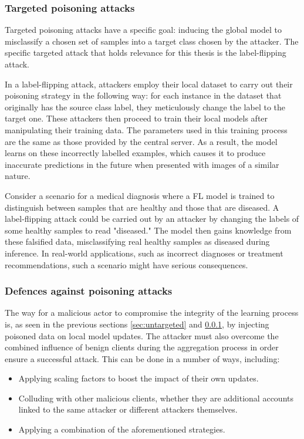 \subsubsection{Targeted poisoning attacks}\label{sec:targeted}
Targeted poisoning attacks have a specific goal: inducing the global model to misclassify a chosen set of samples into a target class chosen by the attacker.
The specific targeted attack that holds relevance for this thesis is the label-flipping attack.

In a label-flipping attack, attackers employ their local dataset to carry out their poisoning strategy in the following way: for each instance in the dataset that originally has the source class label, they meticulously change the label to the target one. These attackers then proceed to train their local models after manipulating their training data. The parameters used in this training process are the same as those provided by the central server. As a result, the model learns on these incorrectly labelled examples, which causes it to produce inaccurate predictions in the future when presented with images of a similar nature.

Consider a scenario for a medical diagnosis where a FL model is trained to distinguish between samples that are healthy and those that are diseased. A label-flipping attack could be carried out by an attacker by changing the labels of some healthy samples to read "diseased." The model then gains knowledge from these falsified data, misclassifying real healthy samples as diseased during inference. In real-world applications, such as incorrect diagnoses or treatment recommendations, such a scenario might have serious consequences. 

\subsubsection{Defences against poisoning attacks}\label{sec:defenses}
The way for a malicious actor to compromise the integrity of the learning process is, as seen in the previous sections \ref{sec:untargeted} and \ref{sec:targeted}, by injecting poisoned data on local model updates. The attacker must also overcome the combined influence of benign clients during the aggregation process in order ensure a successful attack. This can be done in a number of ways, including:
\begin{itemize}
        \item Applying scaling factors to boost the impact of their own updates.
        \item Colluding with other malicious clients, whether they are additional accounts linked to the same attacker or different attackers themselves.
        \item Applying a combination of the aforementioned strategies.
\end{itemize}

